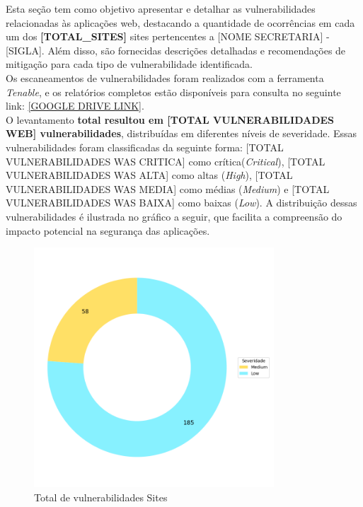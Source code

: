 \documentclass[a4paper,12pt]{article}
\begin{document}
Esta seção tem como objetivo apresentar e detalhar as vulnerabilidades relacionadas às aplicações web, destacando a quantidade de ocorrências em cada um dos \textbf{[TOTAL_SITES]} sites pertencentes a [NOME SECRETARIA] - [SIGLA].
Além disso, são fornecidas descrições detalhadas e recomendações de mitigação para cada tipo de vulnerabilidade identificada.\\

Os escaneamentos de vulnerabilidades foram realizados com a ferramenta \textit{Tenable}, e os relatórios completos estão disponíveis para consulta no seguinte link: \url{[GOOGLE DRIVE LINK]}.\\

O levantamento \textbf{total resultou em [TOTAL VULNERABILIDADES WEB] vulnerabilidades}, distribuídas em diferentes níveis de severidade.
Essas vulnerabilidades foram classificadas da seguinte forma: [TOTAL VULNERABILIDADES WAS CRITICA] como crítica(\textit{Critical}), [TOTAL VULNERABILIDADES WAS ALTA] como altas (\textit{High}), [TOTAL VULNERABILIDADES WAS MEDIA] como médias (\textit{Medium}) e [TOTAL VULNERABILIDADES WAS BAIXA] como baixas (\textit{Low}).
A distribuição dessas vulnerabilidades é ilustrada no gráfico a seguir, que facilita a compreensão do impacto potencial na segurança das aplicações.
\begin{figure}[h!]
    \centering
    \includegraphics[width=0.8\textwidth]{images-was/total-vulnerabilidades-was-donut.png} %
    \caption{Total de vulnerabilidades Sites}
\end{figure}
\FloatBarrier
\end{document}
